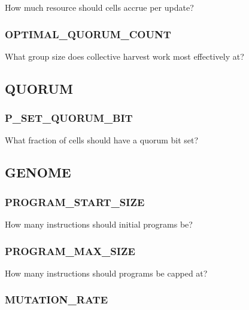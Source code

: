 
How much resource should cells accrue per update?

\subsubsection{OPTIMAL\_QUORUM\_COUNT}


What group size does collective harvest work most effectively at?


\subsection{QUORUM}


\subsubsection{P\_SET\_QUORUM\_BIT}


What fraction of cells should have a quorum bit set?


\subsection{GENOME}

\subsubsection{PROGRAM\_START\_SIZE}


How many instructions should initial programs be?

\subsubsection{PROGRAM\_MAX\_SIZE}


How many instructions should programs be capped at?

\subsubsection{MUTATION\_RATE}

